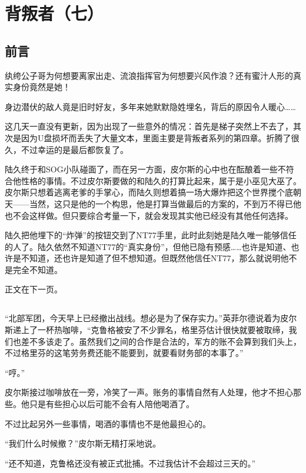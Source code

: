 \chapter{背叛者（七）}

\section*{前言}

纨绔公子哥为何想要离家出走、流浪指挥官为何想要兴风作浪？还有蜜汁人形的真实身份竟然是她！

身边潜伏的敌人竟是旧时好友，多年来她默默隐姓埋名，背后的原因令人暖心……

\lineseparator


这几天一直没有更新，因为出现了一些意外的情况：首先是梯子突然上不去了，其次是因为U盘损坏而丢失了大量文本，里面主要是背叛者系列的第四章。折腾了很久，不过幸运的是最后都恢复了。

陆久终于和SOG小队碰面了，而在另一方面，皮尔斯的心中也在酝酿着一些不符合他性格的事情。不过皮尔斯要做的和陆久的打算比起来，属于是小巫见大巫了。皮尔斯只想着逃离老爹的手掌心，而陆久则想着搞一场大爆炸把这个世界搅个底朝天——当然，这只是他的一个构思，他是打算当做最后的方案的，不到万不得已他也不会这样做。但只要综合考量一下，就会发现其实他已经没有其他任何选择。

陆久把他埋下的“炸弹”的按钮交到了NT77手里，此时此刻她是陆久唯一能够信任的人了。陆久依然不知道NT77的“真实身份”，但他已隐有预感……也许是知道、也许是不知道，还也许是知道了但不想知道。但既然他信任NT77，那么就说明他不是完全不知道。

正文在下一页。

\section*{}

“北部军团，今天早上已经撤出战线。想必是为了保存实力。”英菲尔德说着为皮尔斯递上了一杯热咖啡，“克鲁格被安了不少罪名，格里芬估计很快就要被取缔，我们也差不多该走了。虽然我们之间的合作是合法的，军方的账不会算到我们头上，不过格里芬的这笔劳务费还能不能要到，就要看财务部的本事了。”

“哼。”

皮尔斯接过咖啡放在一旁，冷笑了一声。账务的事情自然有人处理，他才不担心那些。他只是有些担心以后可能不会有人陪他喝酒了。

不过比起另外一些事情，喝酒的事情也不是他最担心的。

“我们什么时候撤？”皮尔斯无精打采地说。

“还不知道，克鲁格还没有被正式批捕。不过我估计不会超过三天的。”

